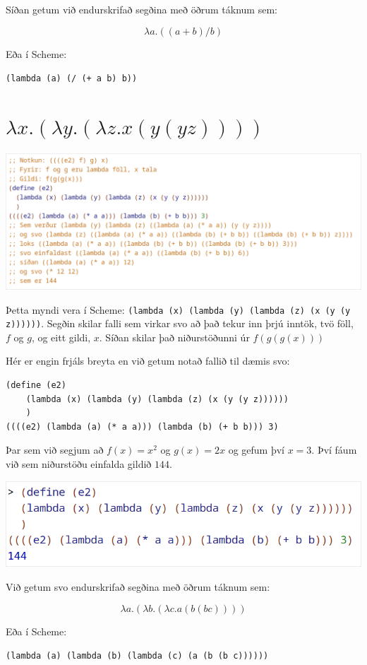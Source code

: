 \documentclass{article}
\begin{document}
	Síðan getum við endurskrifað segðina með öðrum táknum sem:

	\[\lambda a.((a + b)/b)\]

	Eða í Scheme:

	\begin{center}\texttt{(lambda (a) (/ (+ a b) b))}\end{center}

	\section{$\lambda x.(\lambda y.(\lambda z.x(y(yz))))$}

	\begin{center}
		\includegraphics[scale=0.3]{e2.png}
	\end{center}

	Þetta myndi vera í Scheme: \texttt{(lambda (x) (lambda (y) (lambda (z) 
	(x (y (y z))))))}. Segðin skilar falli sem virkar svo að það tekur inn 
	þrjú inntök, tvö föll, $f$ og $g$, og eitt gildi, $x$. 
	Síðan skilar það niðurstöðunni úr $f(g(g(x)))$

	Hér er engin frjáls breyta en við getum notað fallið til dæmis svo:

	\begin{verbatim}
(define (e2)
	(lambda (x) (lambda (y) (lambda (z) (x (y (y z))))))
	)
((((e2) (lambda (a) (* a a))) (lambda (b) (+ b b))) 3)
	\end{verbatim}

	Þar sem við segjum að $f(x) = x^2$ og $g(x) = 2x$ og gefum því $x=3$. 
	Því fáum við sem niðurstöðu einfalda gildið $144$.

	\begin{center}
		\includegraphics[scale=0.275]{144.png}
	\end{center}

	Við getum svo endurskrifað segðina með öðrum táknum sem:

	\[\lambda a.(\lambda b.(\lambda c.a(b(bc))))\]

	Eða í Scheme:

	\begin{center}\texttt{(lambda (a) (lambda (b) 
	(lambda (c) (a (b (b c))))))}\end{center}
\end{document}

